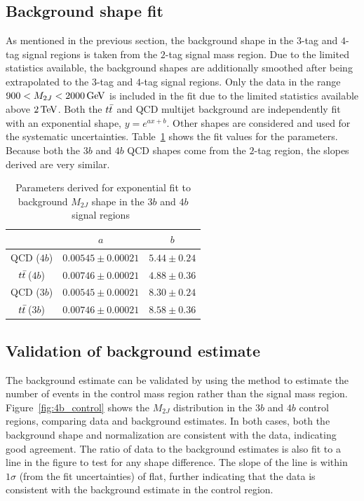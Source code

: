 \subsection{Background shape fit}

As mentioned in the previous section, the background shape in the $3$-tag and $4$-tag signal regions is taken from the $2$-tag signal mass region. Due to the limited statistics available, the background shapes are additionally smoothed after being extrapolated to the $3$-tag and $4$-tag signal regions. Only the data in the range $900 < M_{2J} < 2000 \GeV$ is included in the fit due to the limited statistics available above $2 \TeV$. Both the $t\bar{t}$ and QCD multijet background are independently fit with an exponential shape, $y = e^{ax+b}$. Other shapes are considered and used for the systematic uncertainties. Table~\ref{tab:shape_fit} shows the fit values for the parameters. Because both the $3b$ and $4b$ QCD shapes come from the $2$-tag region, the slopes derived are very similar. 

\begin{table}[h!]
\centering
\captionsetup{justification=centering}

\hspace{-10pt}
\begin{tabular}{|c|c|c|}
\hline
 & $a$ & $b$ \\ \hline
QCD ($4b$) & $0.00545 \pm 0.00021$ & $5.44 \pm 0.24$ \\ 
$t\bar{t}$\,($4b$) & $0.00746 \pm 0.00021$ & $4.88 \pm 0.36$ \\ \hline
QCD ($3b$) & $0.00545 \pm 0.00021$ & $8.30 \pm 0.24$ \\ 
$t\bar{t}$\,($3b$) & $0.00746 \pm 0.00021$ & $8.58 \pm 0.36$ \\ \hline
\end{tabular}
\caption{
Parameters derived for exponential fit to background $M_{2J}$ shape in the $3b$ and $4b$ signal regions~\cite{Qi}
}
\label{tab:shape_fit}
\end{table}

\subsection{Validation of background estimate}

The background estimate can be validated by using the method to estimate the number of events in the control mass region rather than the signal mass region. Figure~\ref{fig:4b_control} shows the $M_{2J}$ distribution in the $3b$ and $4b$ control regions, comparing data and background estimates. In both cases, both the background shape and normalization are consistent with the data, indicating good agreement. The ratio of data to the background estimates is also fit to a line in the figure to test for any shape difference. The slope of the line is within $1\sigma$ (from the fit uncertainties) of flat, further indicating that the data is consistent with the background estimate in the control region. 

